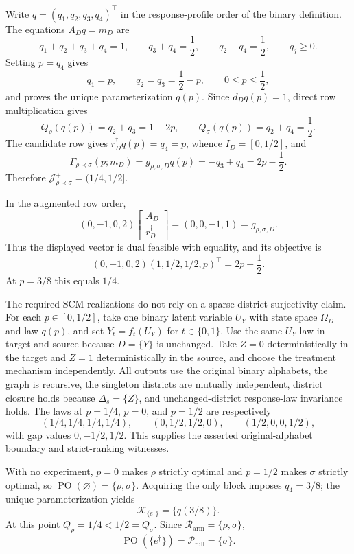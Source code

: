 Write \(q=(q_1,q_2,q_3,q_4)^\top\) in the response-profile order of the binary definition.  The equations \(A_Dq=m_D\) are
\[
q_1+q_2+q_3+q_4=1,
\qquad q_3+q_4=\frac12,
\qquad q_2+q_4=\frac12,
\qquad q_j\geq0.
\]
Setting \(p=q_4\) gives
\[
q_1=p,
\qquad q_2=q_3=\frac12-p,
\qquad 0\leq p\leq\frac12,
\]
and proves the unique parameterization \(q(p)\).  Since \(d_Dq(p)=1\), direct row multiplication gives
\[
Q_\rho(q(p))=q_2+q_3=1-2p,
\qquad
Q_\sigma(q(p))=q_2+q_4=\frac12.
\]
The candidate row gives \(r_D^\dagger q(p)=q_4=p\), whence \(I_D=[0,1/2]\), and
\[
\Gamma_{\rho\prec\sigma}(p;m_D)
=g_{\rho,\sigma,D}q(p)
=-q_3+q_4=2p-\frac12.
\]
Therefore \(\mathcal J_{\rho\prec\sigma}^+=(1/4,1/2]\).

In the augmented row order,
\[
(0,-1,0,2)
\begin{bmatrix}A_D\\ r_D^\dagger\end{bmatrix}
=(0,0,-1,1)=g_{\rho,\sigma,D}.
\]
Thus the displayed vector is dual feasible with equality, and its objective is
\[
(0,-1,0,2)(1,1/2,1/2,p)^\top=2p-\frac12.
\]
At \(p=3/8\) this equals \(1/4\).

The required SCM realizations do not rely on a sparse-district surjectivity claim.  For each \(p\in[0,1/2]\), take one binary latent variable \(U_Y\) with state space \(\Omega_D\) and law \(q(p)\), and set \(Y_t=f_t(U_Y)\) for \(t\in\{0,1\}\).  Use the same \(U_Y\) law in target and source because \(D=\{Y\}\) is unchanged.  Take \(Z=0\) deterministically in the target and \(Z=1\) deterministically in the source, and choose the treatment mechanism independently.  All outputs use the original binary alphabets, the graph is recursive, the singleton districts are mutually independent, district closure holds because \(\Delta_s=\{Z\}\), and unchanged-district response-law invariance holds.  The laws at \(p=1/4\), \(p=0\), and \(p=1/2\) are respectively
\[
(1/4,1/4,1/4,1/4),
\qquad (0,1/2,1/2,0),
\qquad (1/2,0,0,1/2),
\]
with gap values \(0,-1/2,1/2\).  This supplies the asserted original-alphabet boundary and strict-ranking witnesses.

With no experiment, \(p=0\) makes \(\rho\) strictly optimal and \(p=1/2\) makes \(\sigma\) strictly optimal, so
\(
\operatorname{PO}(\varnothing)=\{\rho,\sigma\}
\).
Acquiring the only block imposes \(q_4=3/8\); the unique parameterization yields
\[
\mathcal K_{\{e^\dagger\}}=\{q(3/8)\}.
\]
At this point \(Q_\rho=1/4<1/2=Q_\sigma\).  Since \(\mathcal R_{\mathrm{arm}}=\{\rho,\sigma\}\),
\[
\operatorname{PO}(\{e^\dagger\})
=\mathcal P_{\mathrm{full}}
=\{\sigma\}.
\]